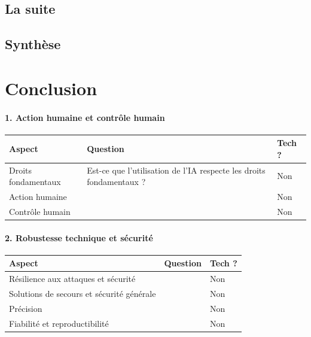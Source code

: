 \documentclass[10pt, french, a4paper]{article}
\begin{document}
\subsection{La suite}

\subsection{Synthèse}


\newpage
\section{Conclusion}

\newpage
% 



\paragraph{1. Action humaine et contrôle humain}

\begin{center}
  \begin{tabular}{ |p{4cm}|p{6cm}|p{2cm}| } 
    \hline
    Aspect & Question & Tech ? \\
    \hline
    \hline
    Droits fondamentaux & Est-ce que l'utilisation de l'IA respecte les droits fondamentaux ? & Non \\
    \hline
    Action humaine & & Non \\
    \hline
    Contrôle humain & & Non \\ 
    \hline
    
  \end{tabular}
\end{center}

\paragraph{2. Robustesse technique et sécurité}

\begin{center}
  \begin{tabular}{ |p{4cm}|p{6cm}|p{2cm}| } 
    \hline
    Aspect & Question & Tech ? \\
    \hline
    \hline
    Résilience aux attaques et sécurité &  & Non \\
    \hline
    Solutions de secours et sécurité générale &  & Non \\
    \hline
    Précision &  & Non \\
    \hline
    Fiabilité et reproductibilité &  & Non \\
    \hline
    
  \end{tabular}
\end{center}
\end{document}
